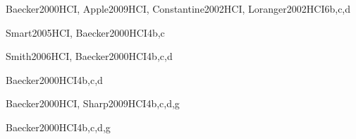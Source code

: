 \begin{syllabus}
\begin{unit}{\HCBuildingGUIInterfacesDef}{}{Baecker2000HCI, Apple2009HCI, Constantine2002HCI, Loranger2002HCI}{6}{b,c,d}
    \HCBuildingGUIInterfacesAllTopics
    \HCBuildingGUIInterfacesAllObjectives
\end{unit}

\begin{unit}{\HCGUIProgrammingDef}{}{Smart2005HCI, Baecker2000HCI}{4}{b,c}
    \HCGUIProgrammingAllTopics
    \HCGUIProgrammingAllObjectives
\end{unit}

\begin{unit}{\HCMultimediaAndMultimodalSystemsDef}{}{Smith2006HCI, Baecker2000HCI}{4}{b,c,d}
    \HCMultimediaAndMultimodalSystemsAllTopics
    \HCMultimediaAndMultimodalSystemsAllObjectives
\end{unit}

\begin{unit}{\HCCollaborationAndCommunicationDef}{}{Baecker2000HCI}{4}{b,c,d}
    \HCCollaborationAndCommunicationAllTopics
    \HCCollaborationAndCommunicationAllObjectives
\end{unit}

\begin{unit}{\HCInteractionDesignForNewEnvironmentsDef}{}{Baecker2000HCI, Sharp2009HCI}{4}{b,c,d,g}
    \HCInteractionDesignForNewEnvironmentsAllTopics
    \HCInteractionDesignForNewEnvironmentsAllObjectives
\end{unit}

\begin{unit}{\HCHumanFactorsAndSecurityDef}{}{Baecker2000HCI}{4}{b,c,d,g}
    \HCHumanFactorsAndSecurityAllTopics
    \HCHumanFactorsAndSecurityAllObjectives
\end{unit}

\begin{coursebibliography}
\end{coursebibliography}
\end{syllabus}
